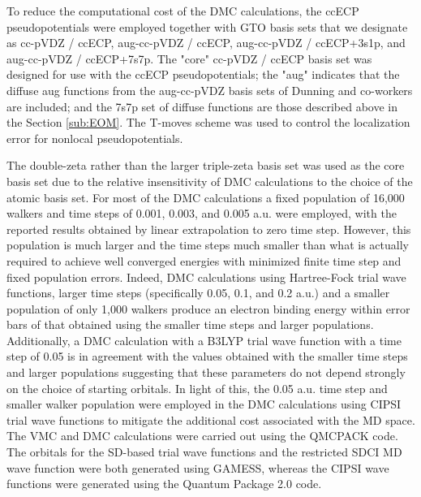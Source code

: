 To reduce the computational cost of the DMC calculations, the ccECP pseudopotentials\cite{10.1063/1.4995643,10.1063/1.5040472} were employed together with GTO basis sets that we designate as cc-pVDZ / ccECP, aug-cc-pVDZ / ccECP, aug-cc-pVDZ / ccECP+3s1p, and aug-cc-pVDZ / ccECP+7s7p. 
The "core" cc-pVDZ / ccECP\cite{10.1063/1.4995643,10.1063/1.5040472} basis set was designed for use with the ccECP pseudopotentials; the "aug" indicates that the diffuse aug functions from the aug-cc-pVDZ basis sets of Dunning and co-workers are included; and the 7s7p set of diffuse functions are those described above in the Section \ref{sub:EOM}.\cite{10.1063/1.462569}
The T-moves scheme was used to control the localization error for nonlocal pseudopotentials.\cite{10.1103/PhysRevB.74.161102}

The double-zeta rather than the larger triple-zeta basis set was used as the core basis set due to the relative insensitivity of DMC calculations to the choice of the atomic basis set. 
For most of the DMC calculations a fixed population of 16,000 walkers and time steps of 0.001, 0.003, and 0.005 a.u. were employed, with the reported results obtained by linear extrapolation to zero time step.
However, this population is much larger and the time steps much smaller than what is actually required to achieve well converged energies with minimized finite time step and fixed population errors.
Indeed, DMC calculations using Hartree-Fock trial wave functions, larger time steps (specifically 0.05, 0.1, and 0.2 a.u.) and a smaller population of only 1,000 walkers produce an electron binding energy within error bars of that obtained using the smaller time steps and larger populations.
Additionally, a DMC calculation with a B3LYP trial wave function with a time step of 0.05 is in agreement with the values obtained with the smaller time steps and larger populations suggesting that these parameters do not depend strongly on the choice of starting orbitals.
In light of this, the 0.05 a.u. time step and smaller walker population were employed in the DMC calculations using CIPSI trial wave functions to mitigate the additional cost associated with the MD space. 
The VMC and DMC calculations were carried out using the QMCPACK code.\cite{10.1088/1361-648X/aab9c3,10.1063/5.0004860}
The orbitals for the SD-based trial wave functions and the restricted SDCI MD wave function were both generated using GAMESS,\cite{10.1002/jcc.540141112,10.1016/B978-044451719-7/50084-6,10.1063/5.0005188} whereas the CIPSI wave functions were generated using the Quantum Package 2.0 code.\cite{10.1021/acs.jctc.9b00176} 

